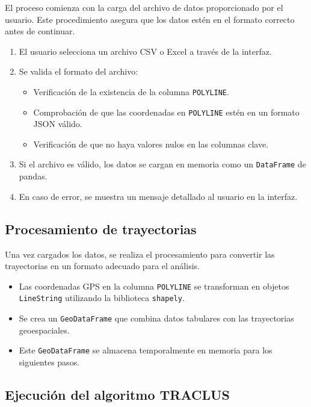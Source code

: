 El proceso comienza con la carga del archivo de datos proporcionado por el usuario. Este procedimiento asegura que los datos estén en el formato correcto antes de continuar.

\begin{enumerate}
    \item El usuario selecciona un archivo CSV o Excel a través de la interfaz.
    \item Se valida el formato del archivo:
    \begin{itemize}
        \item Verificación de la existencia de la columna \texttt{POLYLINE}.
        \item Comprobación de que las coordenadas en \texttt{POLYLINE} estén en un formato JSON válido.
        \item Verificación de que no haya valores nulos en las columnas clave.
    \end{itemize}
    \item Si el archivo es válido, los datos se cargan en memoria como un \texttt{DataFrame} de pandas.
    \item En caso de error, se muestra un mensaje detallado al usuario en la interfaz.
\end{enumerate}

\subsection{Procesamiento de trayectorias}

Una vez cargados los datos, se realiza el procesamiento para convertir las trayectorias en un formato adecuado para el análisis.

\begin{itemize}
    \item Las coordenadas GPS en la columna \texttt{POLYLINE} se transforman en objetos \texttt{LineString} utilizando la biblioteca \texttt{shapely}.
    \item Se crea un \texttt{GeoDataFrame} que combina datos tabulares con las trayectorias geoespaciales.
    \item Este \texttt{GeoDataFrame} se almacena temporalmente en memoria para los siguientes pasos.
\end{itemize}

\subsection{Ejecución del algoritmo TRACLUS}


